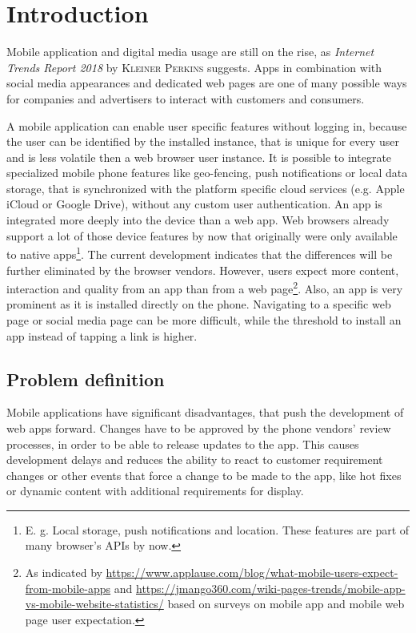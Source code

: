 
\chapter{Introduction}

Mobile application and digital media usage are still on the rise, as \textit{Internet Trends Report 2018} by \textsc{Kleiner Perkins} \cite{perkins_internet_2018} suggests.
Apps in combination with social media appearances and dedicated web pages are one of many possible ways for companies and advertisers to interact with customers and consumers.

A mobile application can enable user specific features without logging in, because the user can be identified by the installed instance, that is unique for every user and is less volatile then a web browser user instance.
It is possible to integrate specialized mobile phone features like geo-fencing, push notifications or local data storage, that is synchronized with the platform specific cloud services (e.g. Apple iCloud or Google Drive), without any custom user authentication.
An app is integrated more deeply into the device than a web app.
Web browsers already support a lot of those device features by now that originally were only available to native apps\footnote{E. g. Local storage, push notifications and location. These features are part of many browser's APIs by now.}.
The current development indicates that the differences will be further eliminated by the browser vendors.
However, users expect more content, interaction and quality from an app than from a web page\footnote{As indicated by \url{https://www.applause.com/blog/what-mobile-users-expect-from-mobile-apps} and \url{https://jmango360.com/wiki-pages-trends/mobile-app-vs-mobile-website-statistics/} based on surveys on mobile app and mobile web page user expectation.}.
Also, an app is very prominent as it is installed directly on the phone.
Navigating to a specific web page or social media page can be more difficult, while the threshold to install an app instead of tapping a link is higher.

\section{Problem definition}

Mobile applications have significant disadvantages, that push the development of web apps forward.
Changes have to be approved by the phone vendors' review processes, in order to be able to release updates to the app.
This causes development delays and reduces the ability to react to customer requirement changes or other events that force a change to be made to the app, like hot fixes or dynamic content with additional requirements for display.

